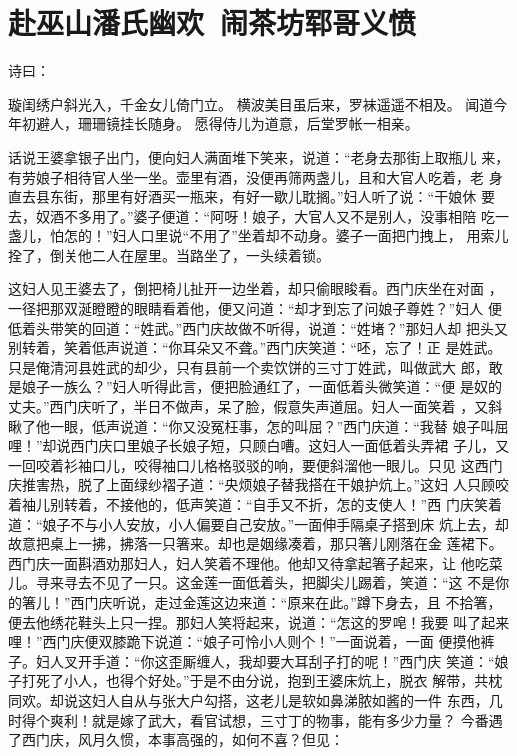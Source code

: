 \chapter{赴巫山潘氏幽欢~闹茶坊郓哥义愤}

诗曰：

璇闺绣户斜光入，千金女儿倚门立。
横波美目虽后来，罗袜遥遥不相及。
闻道今年初避人，珊珊镜挂长随身。
愿得侍儿为道意，后堂罗帐一相亲。

话说王婆拿银子出门，便向妇人满面堆下笑来，说道：“老身去那街上取瓶儿
来，有劳娘子相待官人坐一坐。壶里有酒，没便再筛两盏儿，且和大官人吃着，老
身直去县东街，那里有好酒买一瓶来，有好一歇儿耽搁。”妇人听了说：“干娘休
要去，奴酒不多用了。”婆子便道：“阿呀！娘子，大官人又不是别人，没事相陪
吃一盏儿，怕怎的！”妇人口里说“不用了”坐着却不动身。婆子一面把门拽上，
用索儿拴了，倒关他二人在屋里。当路坐了，一头续着锁。

这妇人见王婆去了，倒把椅儿扯开一边坐着，却只偷眼睃看。西门庆坐在对面
，一径把那双涎瞪瞪的眼睛看着他，便又问道：“却才到忘了问娘子尊姓？”妇人
便低着头带笑的回道：“姓武。”西门庆故做不听得，说道：“姓堵？”那妇人却
把头又别转着，笑着低声说道：“你耳朵又不聋。”西门庆笑道：“呸，忘了！正
是姓武。只是俺清河县姓武的却少，只有县前一个卖饮饼的三寸丁姓武，叫做武大
郎，敢是娘子一族么？”妇人听得此言，便把脸通红了，一面低着头微笑道：“便
是奴的丈夫。”西门庆听了，半日不做声，呆了脸，假意失声道屈。妇人一面笑着
，又斜瞅了他一眼，低声说道：“你又没冤枉事，怎的叫屈？”西门庆道：“我替
娘子叫屈哩！”却说西门庆口里娘子长娘子短，只顾白嘈。这妇人一面低着头弄裙
子儿，又一回咬着衫袖口儿，咬得袖口儿格格驳驳的响，要便斜溜他一眼儿。只见
这西门庆推害热，脱了上面绿纱褶子道：“央烦娘子替我搭在干娘护炕上。”这妇
人只顾咬着袖儿别转着，不接他的，低声笑道：“自手又不折，怎的支使人！”西
门庆笑着道：“娘子不与小人安放，小人偏要自己安放。”一面伸手隔桌子搭到床
炕上去，却故意把桌上一拂，拂落一只箸来。却也是姻缘凑着，那只箸儿刚落在金
莲裙下。西门庆一面斟酒劝那妇人，妇人笑着不理他。他却又待拿起箸子起来，让
他吃菜儿。寻来寻去不见了一只。这金莲一面低着头，把脚尖儿踢着，笑道：“这
不是你的箸儿！”西门庆听说，走过金莲这边来道：“原来在此。”蹲下身去，且
不拾箸，便去他绣花鞋头上只一捏。那妇人笑将起来，说道：“怎这的罗唣！我要
叫了起来哩！”西门庆便双膝跪下说道：“娘子可怜小人则个！”一面说着，一面
便摸他裤子。妇人叉开手道：“你这歪厮缠人，我却要大耳刮子打的呢！”西门庆
笑道：“娘子打死了小人，也得个好处。”于是不由分说，抱到王婆床炕上，脱衣
解带，共枕同欢。却说这妇人自从与张大户勾搭，这老儿是软如鼻涕脓如酱的一件
东西，几时得个爽利！就是嫁了武大，看官试想，三寸丁的物事，能有多少力量？
今番遇了西门庆，风月久惯，本事高强的，如何不喜？但见：

